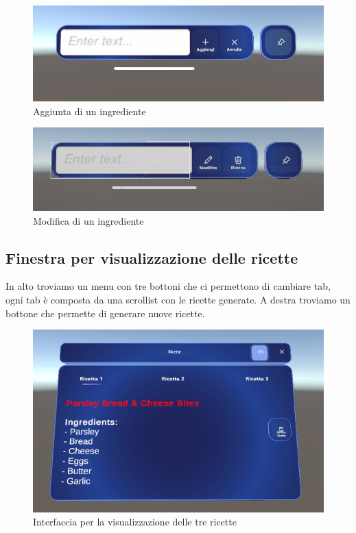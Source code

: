 \begin{figure}[H]
    \centering
    \includegraphics[width=\textwidth,height=\textheight,keepaspectratio]{figures/chapter_1/AGGIUNGI_interfaccia.png}
    \caption{Aggiunta di un ingrediente}
    \label{fig:aggiunta}
\end{figure}

\begin{figure}[H]
    \centering
    \includegraphics[width=\textwidth,height=\textheight,keepaspectratio]{figures/chapter_1/MODIFICA_interfaccia.png}
    \caption{Modifica di un ingrediente}
    \label{fig:modifica}
\end{figure}




\subsection{Finestra per visualizzazione delle ricette}
In alto troviamo un menu con tre bottoni che ci permettono di cambiare tab, ogni tab è composta da una scrollist con le ricette generate. A destra troviamo un bottone che permette di generare nuove ricette.

\begin{figure}[H]
    \centering
    \includegraphics[width=\textwidth,height=\textheight,keepaspectratio]{figures/chapter_1/RICETTE_interfaccia.png}
    \caption{Interfaccia per la visualizzazione delle tre ricette}
    \label{fig:ricette}
\end{figure}



